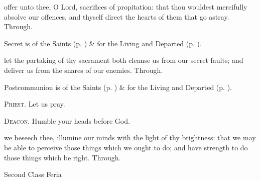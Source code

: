 \secret
{} offer unto thee, O Lord, sacrifices of propitation: that thou wouldest mercifully absolve our offences, and thyself direct the hearts of them that go astray. Through.
\begin{rubric}
     Secret is of the Saints (p. \pageref{SPSaints}) \&  for the Living and Departed (p. \pageref{SPLivingDeparted}).
\end{rubric}
\postcommunion
{} let the partaking of thy sacrament both cleanse us from our secret faults; and deliver us from the snares of our enemies. Through.

\begin{rubric}
     Postcommunion is of the Saints (p. \pageref{SPSaints}) \&  for the Living and Departed (p. \pageref{SPLivingDeparted}).
\end{rubric}

\textsc{Priest.} Let us pray.\par
\textsc{Deacon.} Humble your heads before God.\par
{} we beseech thee, illumine our minds with the light of thy brightness: that we may be able to perceive those things which we ought to do; and have strength to do those things which be right. Through.


\begin{inhead}
{Second Class Feria}
\end{inhead}

\properantiphonfix

